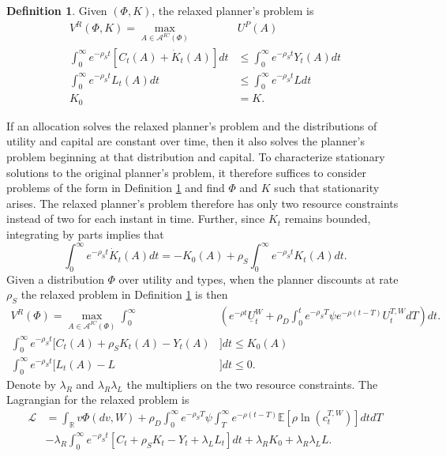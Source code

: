 \documentclass[11pt]{article}
\theoremstyle{plain}
\theoremstyle{definition} %
\newtheorem{defn}{Definition}[section]
\begin{document}
\begin{defn}\label{RELAXplanprob} 
Given $(\Phi,K)$, the relaxed planner's problem is 
\begin{align*}
V^R(\Phi,K) = \max_{A \in \mathcal{A}^{IC}(\Phi)} & U^P(A)
\\ \int_0^{\infty} e^{-\rho_S t}[C_t(A) + \dot{K}_t(A)]dt & \leq \int_0^{\infty} e^{-\rho_S t}Y_t(A)dt
\\ \int_0^{\infty} e^{-\rho_S t}L_t(A)dt & \leq \int_0^{\infty} e^{-\rho_S t}Ldt 
\\ K_0 & = K.
\end{align*}
\end{defn} %
If an allocation solves the relaxed planner's problem and the distributions of utility and capital are constant over time, then it also solves the planner's problem beginning at that distribution and capital. To characterize stationary solutions to the original planner's problem, it therefore suffices to consider problems of the form in Definition \ref{RELAXplanprob} and find $\Phi$ and $K$ such that stationarity arises. The relaxed planner's problem therefore has only two resource constraints instead of two for each instant in time. Further, since $K_t$ remains bounded, integrating by parts implies that
$$
\int_0^{\infty}e^{-\rho_S t}\dot{K}_t(A)dt = -K_0(A) + \rho_S \int_{0}^{\infty}e^{-\rho_S t}K_t(A)dt. 
$$ %
Given a distribution $\Phi$ over utility and types, when the planner discounts at rate $\rho_S$ the relaxed problem in Definition \ref{RELAXplanprob} is then 
\begin{align*}
V^R(\Phi) = \max_{A \in \mathcal{A}^{IC}(\Phi)} \int_0^{\infty} & {\left(e^{-\rho t}\underline{U}^W_t + \rho_D \int_0^te^{-\rho_S T}\psi e^{-\rho  (t-T)} U^{T,W}_tdT\right)}dt.
\\ \int_0^{\infty} e^{-\rho_S t}[C_t(A) + \rho_SK_t(A) - Y_t(A)&]dt \leq K_0(A)
\\ \int_0^{\infty} e^{-\rho_S t}[L_t(A)-L&]dt \leq 0. 
\end{align*} %
Denote by $\lambda_R$ and $\lambda_R\lambda_L$ the multipliers on the two resource constraints. The Lagrangian for the relaxed problem is
\begin{align*}
\mathcal{L} & = \int_{\mathbb{R}} v\Phi(dv,W) + \rho_D\int_0^{\infty}e^{-\rho_ST} \psi \int_T^{\infty}e^{-\rho (t-T)} \mathbb{E} [\rho \ln(c^{T,W}_t)]dt dT
\\ & - \lambda_R \int_0^{\infty} e^{-\rho_S t}[C_t + \rho_SK_t - Y_t + \lambda_LL_t]dt + \lambda_RK_0 + \lambda_R\lambda_LL.
\end{align*}
\end{document}
